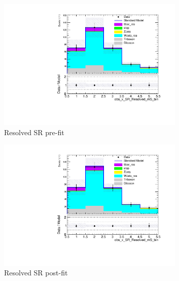 	\begin{figure}[htbp]
	  \centering

	     \begin{subfigure}{0.49\textwidth}
	     \includegraphics[width = 0.98\textwidth]{Figures/5/bkg_only/SR_Resolved_mS_bin_beforeFit.pdf}
	     \caption{Resolved SR pre-fit}
	     \end{subfigure}
	     \begin{subfigure}{0.49\textwidth}
	     \includegraphics[width = 0.98\textwidth]{Figures/5/bkg_only/SR_Resolved_mS_bin_afterFit.pdf}
	     \caption{Resolved SR post-fit}
	     \end{subfigure}
	     \begin{subfigure}{0.49\textwidth}

\end{subfigure}
\end{figure}
